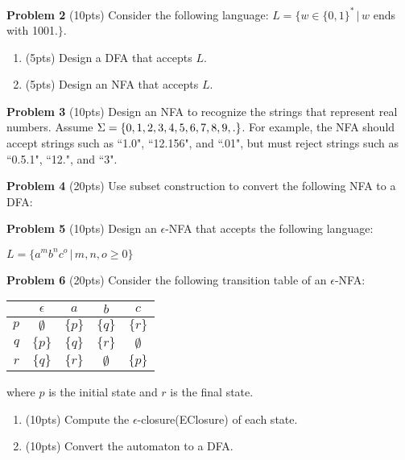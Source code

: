 \documentclass{article}
\begin{document}
    
\noindent \textbf{Problem 2} (10pts) Consider the following language: $L = \{w\in\{0,1\}^{*} \, | \, w$  ends with 1001.$\}$.
    \begin{enumerate}
        \item (5pts) Design a DFA that accepts $L$.
        \item (5pts) Design an NFA that accepts $L$.
    \end{enumerate}
    
\noindent \textbf{Problem 3} (10pts) Design an NFA to recognize the strings that represent real numbers. Assume $\Sigma = \{0,1,2,3,4,5,6,7,8,9,.\}$. For example, the NFA should accept strings such as ``1.0", ``12.156", and ``.01", but must reject strings such as ``0.5.1", ``12.", and ``3".

\noindent \newline \textbf{Problem 4} (20pts) Use subset construction to convert the following NFA to a DFA:
\begin{center}
\end{center}

\noindent \textbf{Problem 5} (10pts) Design an $\epsilon$-NFA that accepts the following language:
\begin{center}
    $L = \{a^{m}b^{n}c^{o}\,|\,m,n,o \geq 0\}$
\end{center}

\noindent \textbf{Problem 6} (20pts) Consider the following transition table of an $\epsilon$-NFA:
    \begin{center}
    \small
        \begin{tabular}{r||c|c|c|c}
        & $\epsilon$ & $a$ & $b$ & $c$\\ \hline\hline
        $p$ & $\emptyset$ & $\{p\}$ & $\{q\}$ & $\{r\}$\\ 
        $q$ & $\{p\}$ & $\{q\}$ & $\{r\}$ & $\emptyset$\\ 
        $r$ & $\{q\}$ & $\{r\}$ & $\emptyset$ & $\{p\}$\\ 
        \end{tabular}
    \end{center}
    where $p$ is the initial state and $r$ is the final state.
    \begin{enumerate}
        \item (10pts) Compute the $\epsilon$-closure(EClosure) of each state.
        \item (10pts) Convert the automaton to a DFA.
    \end{enumerate}
    
\end{document}

